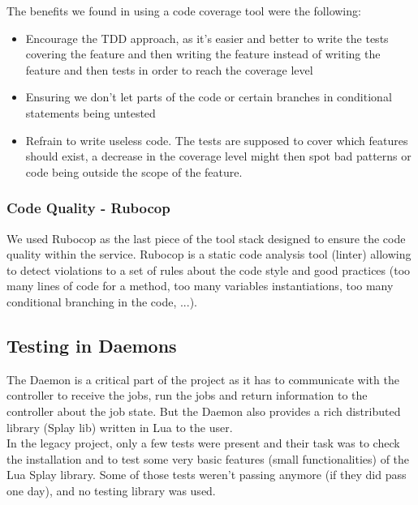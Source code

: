 \documentclass{eplmastersthesis}
\begin{document}
          The benefits we found in using a code coverage tool were the
          following:

          \begin{itemize}
            \item Encourage the TDD approach, as it's easier and better to
            write the tests covering the feature and then writing the feature
            instead of writing the feature and then tests in order to reach
            the coverage level
            \item Ensuring we don't let parts of the code or certain branches
            in conditional statements being untested
            \item Refrain to write useless code. The tests are supposed to cover
            which features should exist, a decrease in the coverage level
            might then spot bad patterns or code being outside the scope
            of the feature.
          \end{itemize}

        \subsubsection{Code Quality - Rubocop}

          We used Rubocop as the last piece of the tool stack designed to ensure
          the code quality within the service. Rubocop is a static code analysis
          tool (linter) allowing to detect violations to a set of rules about
          the code style and good practices (too many lines of code for a method,
          too many variables instantiations, too many conditional branching
          in the code, ...).

      \subsection{Testing in Daemons}

        The Daemon is a critical part of the project as it has to communicate
        with the controller to receive the jobs, run the jobs and return
        information to the controller about the job state. But the Daemon also
        provides a rich distributed library (Splay lib) written in Lua to the user.\\
        In the legacy project, only a few tests were present and their
        task was to check the installation and to test some very basic features
        (small functionalities) of the Lua Splay library. Some of those tests
        weren't passing anymore (if they did pass one day), and no testing
        library was used.\\
\end{document}

